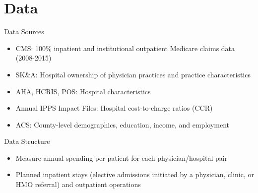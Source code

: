 \documentclass[t,aspectratio=169]{beamer}
\begin{document}
\section{Data}
\begin{frame}{Data Sources}
    \begin{itemize}
        \item<1-> CMS: 100\% inpatient and institutional outpatient Medicare claims data (2008-2015)
        \item<1-> SK\&A: Hospital ownership of physician practices and practice characteristics
        \item<2-> AHA, HCRIS, POS: Hospital characteristics
        \item<2-> Annual IPPS Impact Files: Hospital cost-to-charge ratios (CCR)
        \item<2-> ACS: County-level demographics, education, income, and employment
    \end{itemize}
\end{frame}

\begin{frame}{Data Structure}
    \begin{itemize}
        \item<1-> Measure annual spending per patient for each physician/hospital pair
        \item<1-> Planned inpatient stays (elective admissions initiated by a physician, clinic, or HMO referral) and outpatient operations
    \end{itemize}
\end{frame}
\end{document}
